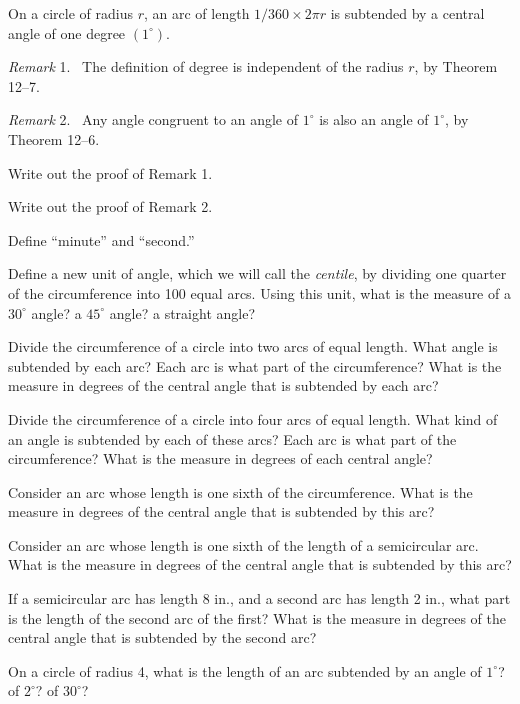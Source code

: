 \documentclass[11pt]{book}
\theoremstyle{bkplain}
\theoremstyle{XIplainnote}
\theoremstyle{bkplain}
\newenvironment{XIIremarkn}[1]{\par\medskip\noindent\emph{Remark} #1.\ }%
  {\par\medskip}
\theoremstyle{bkplain}
\begin{document}
\begin{definition}
On a circle of radius $r$, an arc of length $1/360 \times 2\pi r$ is subtended
by a central angle of one degree $(1^\circ)$.
\end{definition}

\begin{XIIremarkn}{1}
The definition of degree is independent of the radius $r$, by
Theorem 12--7.
\end{XIIremarkn}

\begin{XIIremarkn}{2}
Any angle congruent to an angle of $1^\circ$ is also an angle of
$1^\circ$, by Theorem 12--6.
\end{XIIremarkn}

\begin{exercisecols}
\begin{exlist}
\item Write out the proof of Remark 1.
\item Write out the proof of Remark 2.
\item Define ``minute'' and ``second.''
\item Define a new unit of angle, which we will call the \emph{centile}, by
      dividing one quarter of the circumference into 100 equal arcs. Using this
      unit, what is the measure of a $30^\circ$ angle? a $45^\circ$ angle? a
      straight angle?
\item Divide the circumference of a circle into two arcs of equal length. What
      angle is subtended by each arc? Each arc is what part of the
      circumference? What is the measure in degrees of the central angle that is
      subtended by each arc?
\item Divide the circumference of a circle into four arcs of equal length. What
      kind of an angle is subtended by each of these arcs? Each arc is what part
      of the circumference? What is the measure in degrees of each central
      angle?
\item Consider an arc whose length is one sixth of the circumference. What is
      the measure in degrees of the central angle that is subtended by this arc?
\item Consider an arc whose length is one sixth of the length of a semicircular
      arc. What is the measure in degrees of the central angle that is subtended
      by this arc?
\item If a semicircular arc has length 8 in., and a second arc has length 2 in.,
      what part is the length of the second arc of the first? What is the
      measure in degrees of the central angle that is subtended by the second
      arc?
\item On a circle of radius 4, what is the length of an arc subtended by an
      angle of $1^\circ$? of $2^\circ$? of $30^\circ$?
\end{exlist}
\end{exercisecols}
\end{document}
